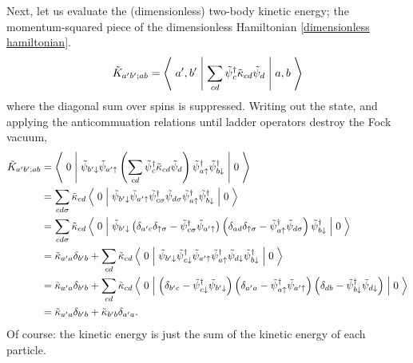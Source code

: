 Next, let us evaluate the (dimensionless) two-body kinetic energy; the momentum-squared piece of the dimensionless Hamiltonian \eqref{dimensionless hamiltonian}.
\begin{align}
    \tilde{K}_{a'b';ab} = \left\langle\;a',b'\;\middle|\;
        \sum_{cd} \tilde{\psi}{}^{\dagger}_c \tilde{\kappa}_{cd} \tilde{\psi}_d
    \;\middle|\;a,b\;\right\rangle
\end{align}
where the diagonal sum over spins is suppressed.
Writing out the state, and applying the anticommuation relations until ladder operators destroy the Fock vacuum,
\begin{align}
    \tilde{K}_{a'b';ab}
    &= \left\langle\;0\;\middle|\;
            \tilde{\psi}_{b'\downarrow} \tilde{\psi}_{a'\uparrow} 
            \left(\sum_{cd} \tilde{\psi}{}^{\dagger}_c \tilde{\kappa}_{cd} \tilde{\psi}_d\right)
            \tilde{\psi}{}^{\dagger}_{a\uparrow} \tilde{\psi}{}^{\dagger}_{b\downarrow}
        \;\middle|\;0\;\right\rangle
    \nonumber\\
    &= \sum_{cd\sigma} \tilde{\kappa}_{cd} \left\langle\;0\;\middle|\;
            \tilde{\psi}_{b'\downarrow} \tilde{\psi}_{a'\uparrow} 
            \tilde{\psi}{}^{\dagger}_{c\sigma} \tilde{\psi}_{d\sigma}
            \tilde{\psi}{}^{\dagger}_{a\uparrow} \tilde{\psi}{}^{\dagger}_{b\downarrow}
        \;\middle|\;0\;\right\rangle
    \nonumber\\
    &= \sum_{cd\sigma} \tilde{\kappa}_{cd} \left\langle\;0\;\middle|\;
            \tilde{\psi}_{b'\downarrow}
            \left(\delta_{a'c}\delta_{\uparrow\sigma} - \tilde{\psi}{}^{\dagger}_{c\sigma} \tilde{\psi}_{a'\uparrow} \right)
            \left(\delta_{ad}\delta_{\uparrow\sigma} - \tilde{\psi}{}^{\dagger}_{a\uparrow}\tilde{\psi}_{d\sigma} \right)
            \tilde{\psi}{}^{\dagger}_{b\downarrow}
        \;\middle|\;0\;\right\rangle
    \nonumber\\
    &= \tilde{\kappa}_{a'a} \delta_{b'b} + \sum_{cd} \tilde{\kappa}_{cd} \left\langle\;0\;\middle|\;
            \tilde{\psi}_{b'\downarrow}
            \tilde{\psi}{}^{\dagger}_{c\downarrow} \tilde{\psi}_{a'\uparrow}
            \tilde{\psi}{}^{\dagger}_{a\uparrow}\tilde{\psi}_{d\downarrow}
            \tilde{\psi}{}^{\dagger}_{b\downarrow}
        \;\middle|\;0\;\right\rangle
    \nonumber\\
    &= \tilde{\kappa}_{a'a} \delta_{b'b} + \sum_{cd} \tilde{\kappa}_{cd} \left\langle\;0\;\middle|\;
            \left(\delta_{b'c} - \tilde{\psi}{}^{\dagger}_{c\downarrow}\tilde{\psi}_{b'\downarrow} \right)
            \left(\delta_{a'a} - \tilde{\psi}{}^{\dagger}_{a\uparrow}\tilde{\psi}_{a'\uparrow} \right)
            \left(\delta_{db} - \tilde{\psi}{}^{\dagger}_{b\downarrow} \tilde{\psi}_{d\downarrow} \right)
        \;\middle|\;0\;\right\rangle
    \nonumber\\
    &= \tilde{\kappa}_{a'a} \delta_{b'b} + \tilde{\kappa}_{b'b} \delta_{a'a}.
    \label{eq:two-body kinetic energy}
\end{align}
Of course: the kinetic energy is just the sum of the kinetic energy of each particle.

